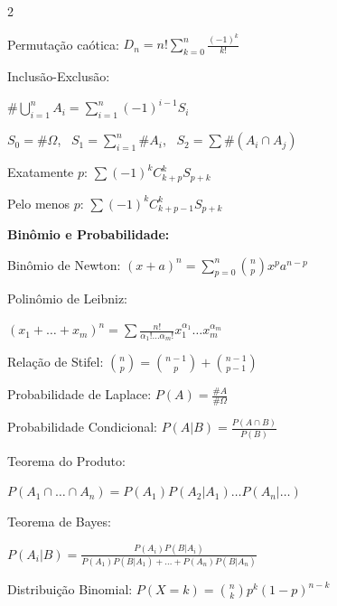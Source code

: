\documentclass[a4paper,12pt]{article}  %
\begin{document}
\begin{multicols}{2}
\begin{scriptsize}
	Permutação caótica: $D_n = n! \sum_{k=0}^n \frac{(-1)^k}{k!}$
	
	Inclusão-Exclusão:
	
	$\# \bigcup_{i=1}^n A_i = \sum_{i=1}^n (-1)^{i-1} S_i$
	
	$S_0 = \#\Omega$, ~$S_1 = \sum_{i=1}^n \# A_i$, ~$S_2 = \sum \#(A_i \cap A_j)$
	
	Exatamente $p$: $\sum (-1)^k C^{k}_{k+p} S_{p+k}$
	
	Pelo menos $p$: $\sum (-1)^k C^{k}_{k+p-1} S_{p+k}$
	
	\textbf{Binômio e Probabilidade:}
	
	Binômio de Newton: $(x+a)^n = \sum_{p=0}^{n}\binom{n}{p}x^p a^{n-p}$
	
	Polinômio de Leibniz:
	
	$(x_1+\dots+x_m)^n = \sum \frac{n!}{\alpha_1! \dots \alpha_m!} x_1^{\alpha_1} \dots x_m^{\alpha_m}$
	
	Relação de Stifel: $\binom{n}{p}=\binom{n-1}{p}+\binom{n-1}{p-1}$
	
	Probabilidade de Laplace: $P(A) = \frac{\# A}{\# \Omega}$
	
	Probabilidade Condicional: $P(A|B) = \frac{P(A \cap B)}{P(B)}$
	
	Teorema do Produto:
	
	$P(A_1 \cap \dots \cap A_n) = P(A_1) P(A_2 | A_1) \dots P(A_n | \dots)$
	
	Teorema de Bayes:
	
	$P(A_i|B) = \frac{P(A_i) P(B|A_i)}{P(A_1) P(B|A_1) + \dots + P(A_n) P(B|A_n)}$
	
	Distribuição Binomial: $P(X = k) = \binom{n}{k} p^k (1-p)^{n-k}$
\end{scriptsize}
\end{multicols}
\end{document}
